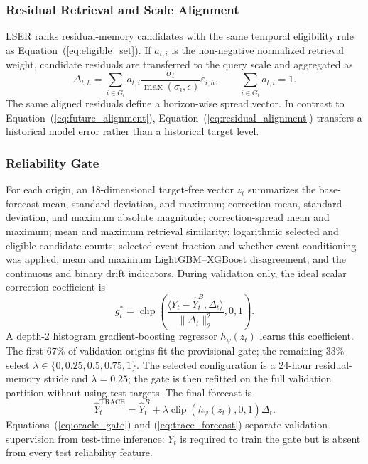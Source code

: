 \documentclass{ieeeaccess}
\begin{document}
\subsubsection{Residual Retrieval and Scale Alignment}
LSER ranks residual-memory candidates with the same temporal eligibility rule
as Equation~(\ref{eq:eligible_set}). If $a_{t,i}$ is the non-negative normalized
retrieval weight, candidate residuals are transferred to the query scale and
aggregated as
\begin{equation}
\Delta_{t,h}=\sum_{i\in G_t}a_{t,i}
\frac{\sigma_t}{\max(\sigma_i,\epsilon)}\varepsilon_{i,h},
\qquad \sum_{i\in G_t}a_{t,i}=1.
\label{eq:residual_alignment}
\end{equation}
The same aligned residuals define a horizon-wise spread vector. In contrast to
Equation~(\ref{eq:future_alignment}), Equation~(\ref{eq:residual_alignment})
transfers a historical model error rather than a historical target level.

\subsubsection{Reliability Gate}
For each origin, an 18-dimensional target-free vector $z_t$ summarizes the
base-forecast mean, standard deviation, and maximum; correction mean, standard
deviation, and maximum absolute magnitude; correction-spread mean and maximum;
mean and maximum retrieval similarity; logarithmic selected and eligible
candidate counts; selected-event fraction and whether event conditioning was
applied; mean and maximum LightGBM--XGBoost disagreement; and the continuous
and binary drift indicators. During validation only, the ideal scalar
correction coefficient is
\begin{equation}
g_t^{*}=\operatorname{clip}\left(
\frac{\langle Y_t-\hat{Y}^{B}_t,\Delta_t\rangle}
{\|\Delta_t\|_2^2},0,1\right).
\label{eq:oracle_gate}
\end{equation}
A depth-2 histogram gradient-boosting regressor $h_{\psi}(z_t)$ learns this
coefficient. The first 67\% of validation origins fit the provisional gate;
the remaining 33\% select
$\lambda\in\{0,0.25,0.5,0.75,1\}$. The selected configuration is a 24-hour
residual-memory stride and $\lambda=0.25$; the gate is then refitted on the full
validation partition without using test targets. The final forecast is
\begin{equation}
\hat{Y}^{\mathrm{TRACE}}_t=\hat{Y}^{B}_t+
\lambda\operatorname{clip}(h_{\psi}(z_t),0,1)\Delta_t.
\label{eq:trace_forecast}
\end{equation}
Equations~(\ref{eq:oracle_gate}) and (\ref{eq:trace_forecast}) separate
validation supervision from test-time inference: $Y_t$ is required to train
the gate but is absent from every test reliability feature.
\end{document}
